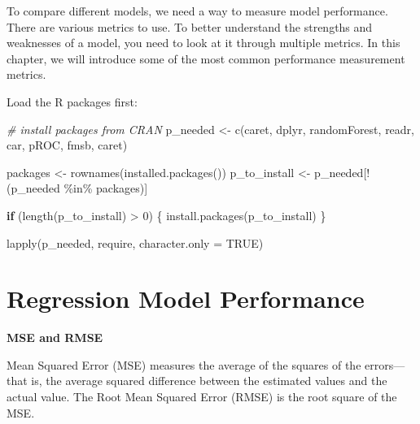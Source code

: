 \documentclass[
  12pt,
]{krantz}
\makeatletter
\newenvironment{Shaded}{\begin{snugshade}}{\end{snugshade}}
\newcommand{\AttributeTok}[1]{\textcolor[rgb]{0.61,0.61,0.61}{#1}}
\newcommand{\CommentTok}[1]{\textcolor[rgb]{0.37,0.37,0.37}{\textit{#1}}}
\newcommand{\ConstantTok}[1]{\textcolor[rgb]{0,0,0}{#1}}
\newcommand{\ControlFlowTok}[1]{\textcolor[rgb]{0.27,0.27,0.27}{\textbf{#1}}}
\newcommand{\DecValTok}[1]{\textcolor[rgb]{0.06,0.06,0.06}{#1}}
\newcommand{\FunctionTok}[1]{\textcolor[rgb]{0,0,0}{#1}}
\newcommand{\NormalTok}[1]{#1}
\newcommand{\OtherTok}[1]{\textcolor[rgb]{0.37,0.37,0.37}{#1}}
\newcommand{\SpecialCharTok}[1]{\textcolor[rgb]{0,0,0}{#1}}
\newcommand{\StringTok}[1]{\textcolor[rgb]{0.5,0.5,0.5}{#1}}
\newenvironment{kframe}{%
\medskip{}
\setlength{\fboxsep}{.8em}
 \def\at@end@of@kframe{}%
 \ifinner\ifhmode%
  \def\at@end@of@kframe{\end{minipage}}%
  \begin{minipage}{\columnwidth}%
 \fi\fi%
 \def\FrameCommand##1{\hskip\@totalleftmargin \hskip-\fboxsep
 \colorbox{shadecolor}{##1}\hskip-\fboxsep
     \hskip-\linewidth \hskip-\@totalleftmargin \hskip\columnwidth}%
 \MakeFramed {\advance\hsize-\width
   \@totalleftmargin\z@ \linewidth\hsize
   \@setminipage}}%
 {\par\unskip\endMakeFramed%
 \at@end@of@kframe}
\renewenvironment{Shaded}{\begin{kframe}}{\end{kframe}}
\makeatother
\begin{document}
To compare different models, we need a way to measure model performance. There are various metrics to use. To better understand the strengths and weaknesses of a model, you need to look at it through multiple metrics. In this chapter, we will introduce some of the most common performance measurement metrics.

Load the R packages first:

\begin{Shaded}
\begin{Highlighting}[]
\CommentTok{\# install packages from CRAN}
\NormalTok{p\_needed }\OtherTok{\textless{}{-}} \FunctionTok{c}\NormalTok{(}\StringTok{\textquotesingle{}caret\textquotesingle{}}\NormalTok{, }\StringTok{\textquotesingle{}dplyr\textquotesingle{}}\NormalTok{, }\StringTok{\textquotesingle{}randomForest\textquotesingle{}}\NormalTok{,}
              \StringTok{\textquotesingle{}readr\textquotesingle{}}\NormalTok{, }\StringTok{\textquotesingle{}car\textquotesingle{}}\NormalTok{, }\StringTok{\textquotesingle{}pROC\textquotesingle{}}\NormalTok{, }\StringTok{\textquotesingle{}fmsb\textquotesingle{}}\NormalTok{, }\StringTok{\textquotesingle{}caret\textquotesingle{}}\NormalTok{)}

\NormalTok{packages }\OtherTok{\textless{}{-}} \FunctionTok{rownames}\NormalTok{(}\FunctionTok{installed.packages}\NormalTok{())}
\NormalTok{p\_to\_install }\OtherTok{\textless{}{-}}\NormalTok{ p\_needed[}\SpecialCharTok{!}\NormalTok{(p\_needed }\SpecialCharTok{\%in\%}\NormalTok{ packages)]}

\ControlFlowTok{if}\NormalTok{ (}\FunctionTok{length}\NormalTok{(p\_to\_install) }\SpecialCharTok{\textgreater{}} \DecValTok{0}\NormalTok{) \{}
    \FunctionTok{install.packages}\NormalTok{(p\_to\_install)}
\NormalTok{\}}

\FunctionTok{lapply}\NormalTok{(p\_needed, require, }\AttributeTok{character.only =} \ConstantTok{TRUE}\NormalTok{)}
\end{Highlighting}
\end{Shaded}

\hypertarget{regression-model-performance}{%
\section{Regression Model Performance}\label{regression-model-performance}}

\textbf{MSE and RMSE}

Mean Squared Error (MSE) measures the average of the squares of the errors---that is, the average squared difference between the estimated values and the actual value. The Root Mean Squared Error (RMSE) is the root square of the MSE.
\end{document}
